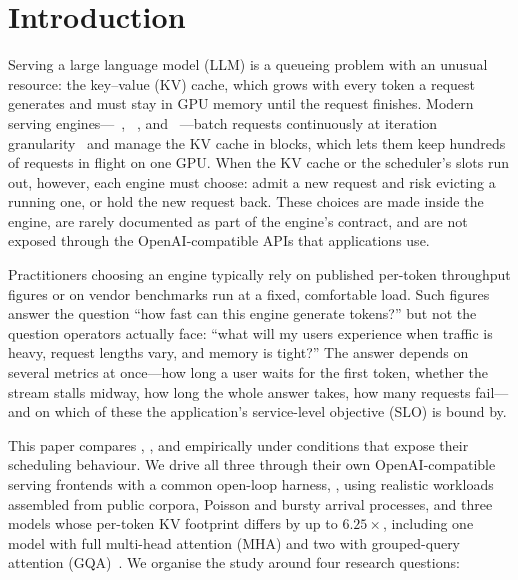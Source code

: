 \section{Introduction}
\label{sec:intro}

Serving a large language model (LLM) is a queueing problem with an unusual resource: the
key--value (KV) cache, which grows with every token a request generates and must stay in GPU
memory until the request finishes. Modern serving engines---\vllm~\cite{kwon2023vllm},
\sglang~\cite{zheng2024sglang}, and \trt~\cite{trtllm}---batch requests continuously at
iteration granularity~\cite{yu2022orca} and manage the KV cache in blocks, which lets them
keep hundreds of requests in flight on one GPU. When the KV cache or the scheduler's slots
run out, however, each engine must choose: admit a new request and risk evicting a running
one, or hold the new request back. These choices are made inside the engine, are rarely
documented as part of the engine's contract, and are not exposed through the OpenAI-compatible
APIs that applications use.

Practitioners choosing an engine typically rely on published per-token throughput figures or
on vendor benchmarks run at a fixed, comfortable load. Such figures answer the question
``how fast can this engine generate tokens?'' but not the question operators actually face:
``what will my users experience when traffic is heavy, request lengths vary, and memory is
tight?'' The answer depends on several metrics at once---how long a user waits for the first
token, whether the stream stalls midway, how long the whole answer takes, how many requests
fail---and on which of these the application's service-level objective (SLO) is bound by.

This paper compares \vllm, \sglang, and \trt empirically under conditions that expose their
scheduling behaviour. We drive all three through their own OpenAI-compatible serving
frontends with a common open-loop harness, \sysname, using realistic workloads assembled from
public corpora, Poisson and bursty arrival processes, and three models whose per-token KV
footprint differs by up to $6.25\times$, including one model with full multi-head attention
(MHA) and two with grouped-query attention (GQA)~\cite{ainslie2023gqa}. We organise the study
around four research questions:

